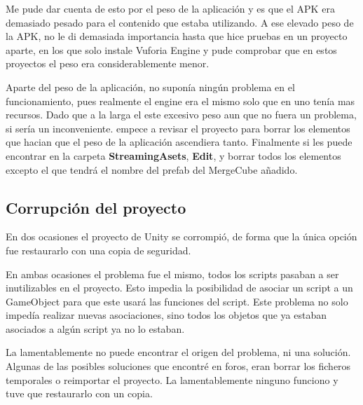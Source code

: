 Me pude dar cuenta de esto por el peso de la aplicación y es que el APK era demasiado pesado para el contenido que estaba utilizando. A ese elevado peso de la APK, no le di demasiada importancia hasta que hice pruebas en un proyecto aparte, en los que solo instale Vuforia Engine y pude comprobar que en estos proyectos el peso era considerablemente menor.

Aparte del peso de la aplicación, no suponía ningún problema en el funcionamiento, pues realmente el engine era el mismo solo que en uno tenía mas recursos. Dado que a la larga el este excesivo peso aun que no fuera un problema, si sería un inconveniente. empece a revisar el proyecto para borrar los elementos que hacian que el peso de la aplicación ascendiera tanto. Finalmente si les puede encontrar en la carpeta \textbf{StreamingAsets}, \textbf{Edit}, y borrar todos los elementos excepto el que tendrá el nombre del prefab del MergeCube añadido.

\subsection{Corrupción del proyecto}

En dos ocasiones el proyecto de Unity se corrompió, de forma que la única opción fue restaurarlo con una copia de seguridad. 

En ambas ocasiones el problema fue el mismo, todos los scripts pasaban a ser inutilizables en el proyecto. Esto impedia la posibilidad de asociar un script a un GameObject para que este usará las funciones del script. Este problema no solo impedía realizar nuevas asociaciones, sino todos los objetos que ya estaban asociados a algún script ya no lo estaban.

La lamentablemente no puede encontrar el origen del problema, ni una solución. Algunas de las posibles soluciones que encontré en foros, eran borrar los ficheros temporales o reimportar el proyecto. La lamentablemente ninguno funciono y tuve que restaurarlo con un copia. 




